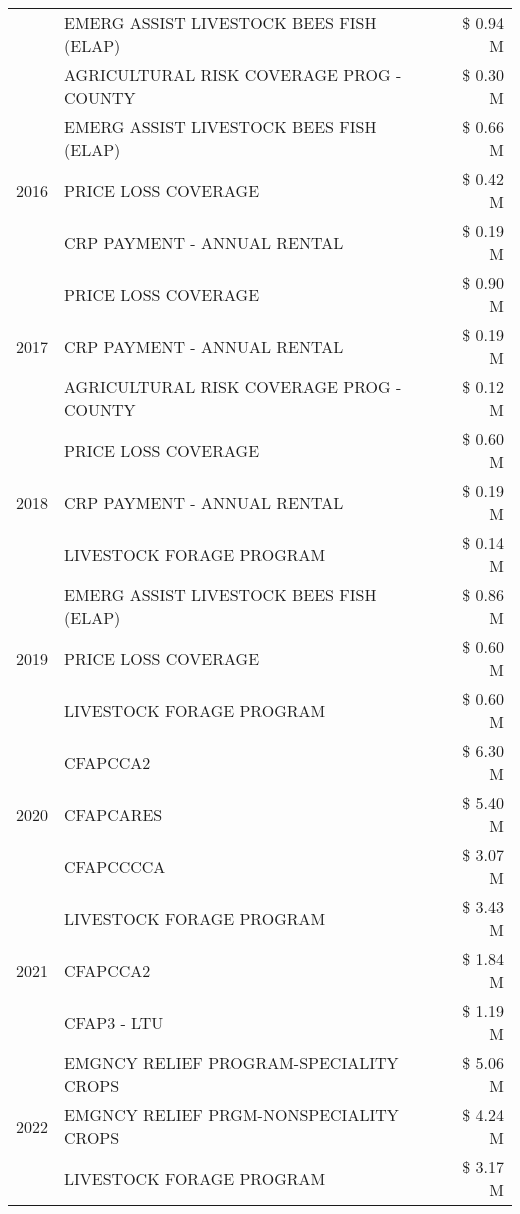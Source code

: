 \begin{tabular}{llr}
 & EMERG ASSIST LIVESTOCK BEES FISH (ELAP) & \$ 0.94 M \\
 & AGRICULTURAL RISK COVERAGE PROG - COUNTY & \$ 0.30 M \\
\cline{1-3}
\multirow[t]{3}{*}{2016} & EMERG ASSIST LIVESTOCK BEES FISH (ELAP) & \$ 0.66 M \\
 & PRICE LOSS COVERAGE & \$ 0.42 M \\
 & CRP PAYMENT - ANNUAL RENTAL & \$ 0.19 M \\
\cline{1-3}
\multirow[t]{3}{*}{2017} & PRICE LOSS COVERAGE & \$ 0.90 M \\
 & CRP PAYMENT - ANNUAL RENTAL & \$ 0.19 M \\
 & AGRICULTURAL RISK COVERAGE PROG - COUNTY & \$ 0.12 M \\
\cline{1-3}
\multirow[t]{3}{*}{2018} & PRICE LOSS COVERAGE & \$ 0.60 M \\
 & CRP PAYMENT - ANNUAL RENTAL & \$ 0.19 M \\
 & LIVESTOCK FORAGE PROGRAM & \$ 0.14 M \\
\cline{1-3}
\multirow[t]{3}{*}{2019} & EMERG ASSIST LIVESTOCK BEES FISH (ELAP) & \$ 0.86 M \\
 & PRICE LOSS COVERAGE & \$ 0.60 M \\
 & LIVESTOCK FORAGE PROGRAM & \$ 0.60 M \\
\cline{1-3}
\multirow[t]{3}{*}{2020} & CFAPCCA2 & \$ 6.30 M \\
 & CFAPCARES & \$ 5.40 M \\
 & CFAPCCCCA & \$ 3.07 M \\
\cline{1-3}
\multirow[t]{3}{*}{2021} & LIVESTOCK FORAGE PROGRAM & \$ 3.43 M \\
 & CFAPCCA2 & \$ 1.84 M \\
 & CFAP3 - LTU & \$ 1.19 M \\
\cline{1-3}
\multirow[t]{3}{*}{2022} & EMGNCY RELIEF PROGRAM-SPECIALITY CROPS & \$ 5.06 M \\
 & EMGNCY RELIEF PRGM-NONSPECIALITY CROPS & \$ 4.24 M \\
 & LIVESTOCK FORAGE PROGRAM & \$ 3.17 M \\
\cline{1-3}
\bottomrule
\end{tabular}
